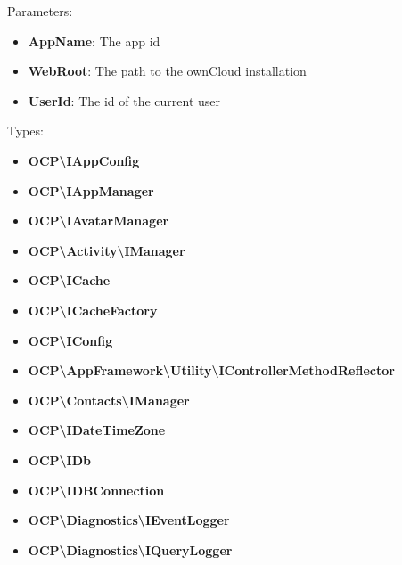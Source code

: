 \documentclass[letterpaper,10pt,english]{sphinxmanual}
\begin{document}
Parameters:
\begin{itemize}
\item {} 
\textbf{AppName}: The app id

\item {} 
\textbf{WebRoot}: The path to the ownCloud installation

\item {} 
\textbf{UserId}: The id of the current user

\end{itemize}

Types:
\begin{itemize}
\item {} 
\textbf{OCP\textbackslash{}IAppConfig}

\item {} 
\textbf{OCP\textbackslash{}IAppManager}

\item {} 
\textbf{OCP\textbackslash{}IAvatarManager}

\item {} 
\textbf{OCP\textbackslash{}Activity\textbackslash{}IManager}

\item {} 
\textbf{OCP\textbackslash{}ICache}

\item {} 
\textbf{OCP\textbackslash{}ICacheFactory}

\item {} 
\textbf{OCP\textbackslash{}IConfig}

\item {} 
\textbf{OCP\textbackslash{}AppFramework\textbackslash{}Utility\textbackslash{}IControllerMethodReflector}

\item {} 
\textbf{OCP\textbackslash{}Contacts\textbackslash{}IManager}

\item {} 
\textbf{OCP\textbackslash{}IDateTimeZone}

\item {} 
\textbf{OCP\textbackslash{}IDb}

\item {} 
\textbf{OCP\textbackslash{}IDBConnection}

\item {} 
\textbf{OCP\textbackslash{}Diagnostics\textbackslash{}IEventLogger}

\item {} 
\textbf{OCP\textbackslash{}Diagnostics\textbackslash{}IQueryLogger}


\end{itemize}
\end{document}
